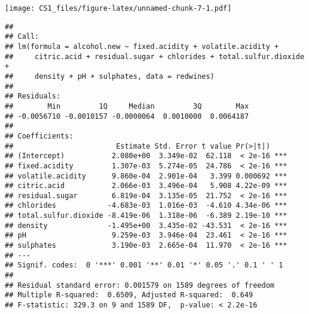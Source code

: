 \documentclass[
]{article}
\newenvironment{Shaded}{\begin{snugshade}}{\end{snugshade}}
\newcommand{\DataTypeTok}[1]{\textcolor[rgb]{0.13,0.29,0.53}{#1}}
\newcommand{\DecValTok}[1]{\textcolor[rgb]{0.00,0.00,0.81}{#1}}
\newcommand{\KeywordTok}[1]{\textcolor[rgb]{0.13,0.29,0.53}{\textbf{#1}}}
\newcommand{\NormalTok}[1]{#1}
\newcommand{\OperatorTok}[1]{\textcolor[rgb]{0.81,0.36,0.00}{\textbf{#1}}}
\newcommand{\StringTok}[1]{\textcolor[rgb]{0.31,0.60,0.02}{#1}}
\begin{document}
\texttt{[image: CS1\_files/figure-latex/unnamed-chunk-7-1.pdf]}

\begin{Shaded}
\end{Shaded}

\begin{verbatim}
## 
## Call:
## lm(formula = alcohol.new ~ fixed.acidity + volatile.acidity + 
##     citric.acid + residual.sugar + chlorides + total.sulfur.dioxide + 
##     density + pH + sulphates, data = redwines)
## 
## Residuals:
##        Min         1Q     Median         3Q        Max 
## -0.0056710 -0.0010157 -0.0000064  0.0010000  0.0064187 
## 
## Coefficients:
##                        Estimate Std. Error t value Pr(>|t|)    
## (Intercept)           2.080e+00  3.349e-02  62.118  < 2e-16 ***
## fixed.acidity         1.307e-03  5.274e-05  24.786  < 2e-16 ***
## volatile.acidity      9.860e-04  2.901e-04   3.399 0.000692 ***
## citric.acid           2.066e-03  3.496e-04   5.908 4.22e-09 ***
## residual.sugar        6.819e-04  3.135e-05  21.752  < 2e-16 ***
## chlorides            -4.683e-03  1.016e-03  -4.610 4.34e-06 ***
## total.sulfur.dioxide -8.419e-06  1.318e-06  -6.389 2.19e-10 ***
## density              -1.495e+00  3.435e-02 -43.531  < 2e-16 ***
## pH                    9.259e-03  3.946e-04  23.461  < 2e-16 ***
## sulphates             3.190e-03  2.665e-04  11.970  < 2e-16 ***
## ---
## Signif. codes:  0 '***' 0.001 '**' 0.01 '*' 0.05 '.' 0.1 ' ' 1
## 
## Residual standard error: 0.001579 on 1589 degrees of freedom
## Multiple R-squared:  0.6509, Adjusted R-squared:  0.649 
## F-statistic: 329.3 on 9 and 1589 DF,  p-value: < 2.2e-16
\end{verbatim}
\end{document}
